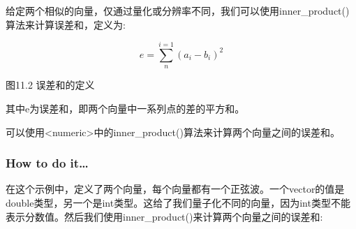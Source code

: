 
给定两个相似的向量，仅通过量化或分辨率不同，我们可以使用inner\_product()算法来计算误差和，定义为:

\begin{equation*}
e=\sum_{n}^{i=1}(a_i-b_i)^2
\end{equation*}

\begin{center}
图11.2 误差和的定义
\end{center}

其中e为误差和，即两个向量中一系列点的差的平方和。

可以使用<numeric>中的inner\_product()算法来计算两个向量之间的误差和。

\subsubsection{How to do it…}

在这个示例中，定义了两个向量，每个向量都有一个正弦波。一个vector的值是double类型，另一个是int类型。这给了我们量子化不同的向量，因为int类型不能表示分数值。然后我们使用inner\_product()来计算两个向量之间的误差和:

